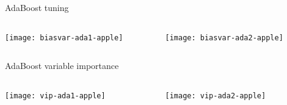 \begin{frame}{AdaBoost tuning}



\begin{columns}[T]
\hspace*{-2.4em}\begin{column}{0.5\textwidth}
	\texttt{[image: biasvar-ada1-apple]}
\end{column}
\begin{column}{0.5\textwidth}
	\texttt{[image: biasvar-ada2-apple]}
\end{column}
\end{columns}

\end{frame}


\begin{frame}{AdaBoost variable importance}



\begin{columns}[T]
\hspace*{-3.5em}\begin{column}{0.5\textwidth}
	\texttt{[image: vip-ada1-apple]}
\end{column}
\hspace*{-1.5em}\begin{column}{0.5\textwidth}
	\texttt{[image: vip-ada2-apple]}
\end{column}
\end{columns}

\end{frame}


